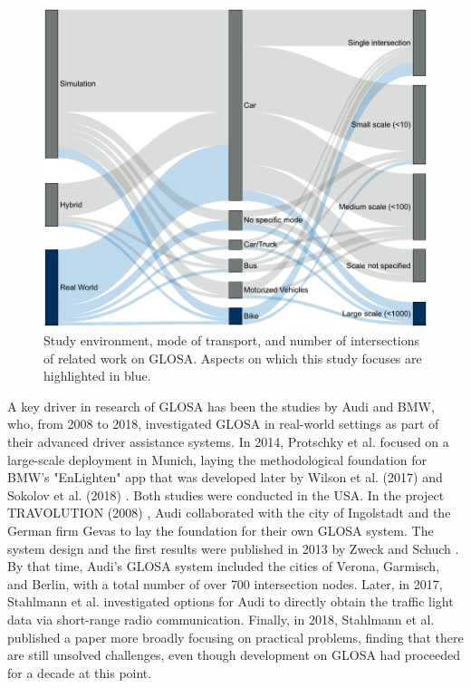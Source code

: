 \begin{figure}
\centering
\includegraphics[width=\linewidth]{images/related-work-sankey.pdf}
\caption{Study environment, mode of transport, and number of intersections of related work on GLOSA. Aspects on which this study focuses are highlighted in blue.}
\label{fig:related-work-piechart}
\end{figure}

A key driver in research of GLOSA has been the studies by Audi and BMW, who, from 2008 to 2018, investigated GLOSA in real-world settings as part of their advanced driver assistance systems. In 2014, Protschky et al. \cite{protschky_extensive_2014, protschky_adaptive_2014} focused on a large-scale deployment in Munich, laying the methodological foundation for BMW's "EnLighten" app that was developed later by Wilson et al. (2017) \cite{wilson_driver_2017} and Sokolov et al. (2018) \cite{sokolov_effects_2018}. Both studies were conducted in the USA. In the project TRAVOLUTION (2008) \cite{braun_travolution-netzweite_2009}, Audi collaborated with the city of Ingolstadt and the German firm Gevas to lay the foundation for their own GLOSA system. The system design and the first results were published in 2013 by Zweck and Schuch \cite{zweck_traffic_2013}. By that time, Audi's GLOSA system included the cities of Verona, Garmisch, and Berlin, with a total number of over 700 intersection nodes. Later, in 2017, Stahlmann et al. \cite{stahlmann_multi-hop_2017} investigated options for Audi to directly obtain the traffic light data via short-range radio communication. Finally, in 2018, Stahlmann et al. \cite{stahlmann_exploring_2018} published a paper more broadly focusing on practical problems, finding that there are still unsolved challenges, even though development on GLOSA had proceeded for a decade at this point.

